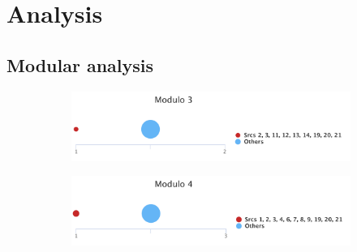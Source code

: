 \chapter{Analysis}

\section{Modular analysis}
\label{appendix-modular-analysis}

\begin{figure}[H]
\begin{subfigure}{0.45\textwidth}
	\includegraphics[width=\linewidth]{tex/images/analysis/mod3}
\end{subfigure}
\hfill
\begin{subfigure}{0.45\textwidth}
	\includegraphics[width=\linewidth]{tex/images/analysis/mod4}
\end{subfigure}\\


\end{figure}
